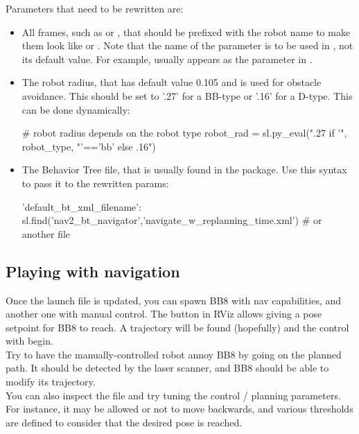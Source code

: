 \documentclass{ecnreport}
\begin{document}
Parameters that need to be rewritten are:
\begin{itemize}
 \item All frames, such as  or , that should be prefixed with the robot name to make them look like  or . Note that the name of the parameter is to be used in , not its default value. For example,  usually appears as the  parameter in .
 \item The robot radius, that has default value 0.105 and is used for obstacle avoidance. This should be set to '.27' for a BB-type or '.16' for a D-type. This can be done dynamically:
\begin{pythoncodelarge}
# robot radius depends on the robot type
robot_rad = sl.py_eval(".27 if '", robot_type, "'=='bb' else .16")
\end{pythoncodelarge}
\item The Behavior Tree file, that is usually found in the  package. Use this syntax to pass it to the rewritten params:
\begin{pythoncode}
 'default_bt_xml_filename': sl.find('nav2_bt_navigator','navigate_w_replanning_time.xml')   # or another file
\end{pythoncode}
\end{itemize}

\subsection{Playing with navigation}

Once the launch file is updated, you can spawn BB8 with nav capabilities, and another one with manual control. The  button in RViz allows giving a pose setpoint for BB8 to reach. A trajectory will be found (hopefully) and the control with begin.\\

Try to have the manually-controlled robot annoy BB8 by going on the planned path. It should be detected by the laser scanner, and BB8 should be able to modify its trajectory.\\

You can also inspect the  file and try tuning the control / planning parameters. For instance, it may be allowed or not to move backwards, and various thresholds are defined to consider that the desired pose is reached.
\end{document}
